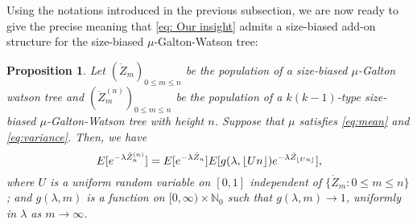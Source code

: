\documentclass[12pt,a4paper]{amsart}
\DeclarePairedDelimiter\floor{\lfloor}{\rfloor}
\newtheorem{prop}[thm]{Proposition}
\numberwithin{equation}{section}
\begin{document}
	Using the notations introduced in the previous subsection, we are now ready to give the precise meaning that \eqref{eq: Our insight} admits a size-biased add-on structure for the size-biased $\mu$-Galton-Watson tree:
\begin{prop}\label{prop: size-biased add-on of size-biased tree }
	Let $(\dot Z_m)_{0 \leq m \leq n}$ be the population of a size-biased $\mu$-Galton watson tree and $(\ddot Z^{(n)}_m)_{0 \leq m \leq n}$ be the population of a $k(k-1)$-type size-biased $\mu$-Galton-Watson tree with height $n$.
	Suppose that $\mu$ satisfies \eqref{eq:mean} and \eqref{eq:variance}.
	Then, we have
\[
	E [ e^{- \lambda \ddot Z_n^{(n)}} ]
	= E [e^{-\lambda \dot Z_n}] E[g(\lambda, \floor{Un})e^{-\lambda \dot Z_{\floor{Un}}}],
\]
where $U$ is a uniform random variable on $[0,1]$ independent of $\{\dot Z_m: 0\le m\le n\}$; 
and $g(\lambda, m)$ is a function on $[0,\infty) \times \mathbb N_0$ such that
$g(\lambda, m) \to 1$, uniformly in $\lambda$ as $m\to \infty$.
\end{prop}
\end{document}
